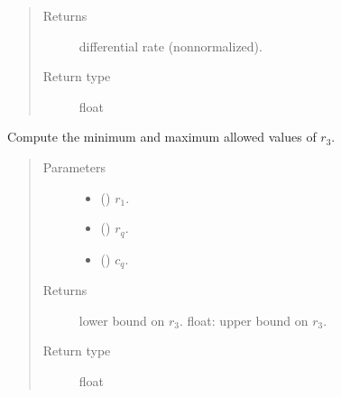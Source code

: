 \documentclass[letterpaper,10pt,english]{sphinxmanual}
\begin{document}
\begin{fulllineitems}
\begin{fulllineitems}
\begin{quote}
\begin{description}
\begin{itemize}
\end{itemize}

\item[{Returns}] \leavevmode
differential rate (non\sphinxhyphen{}normalized).

\item[{Return type}] \leavevmode
float

\end{description}\end{quote}

\end{fulllineitems}


\begin{fulllineitems}
\label{\detokenize{code_structure:scdc.initial.distribution.integral.RateIntegrator.r3_domain}}
Compute the minimum and maximum allowed values of \(r_3\).
\begin{quote}\begin{description}
\item[{Parameters}] \leavevmode\begin{itemize}
\item {} 
 () \textendash{} \(r_1\).

\item {} 
 () \textendash{} \(r_q\).

\item {} 
 () \textendash{} \(c_q\).

\end{itemize}

\item[{Returns}] \leavevmode
lower bound on \(r_3\).
float: upper bound on \(r_3\).

\item[{Return type}] \leavevmode
float

\end{description}\end{quote}

\end{fulllineitems}


\end{fulllineitems}
\end{document}

